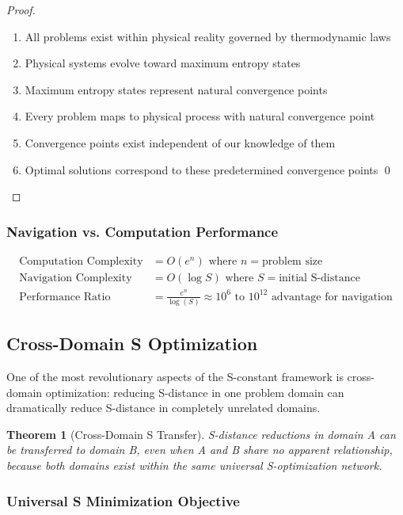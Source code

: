 \documentclass[12pt,a4paper]{article}
\newtheorem{theorem}{Theorem}[section]
\begin{document}
{{{{{{{{{{{{{{\begin{proof}
\begin{enumerate}
\item All problems exist within physical reality governed by thermodynamic laws
\item Physical systems evolve toward maximum entropy states
\item Maximum entropy states represent natural convergence points
\item Every problem maps to physical process with natural convergence point
\item Convergence points exist independent of our knowledge of them
\item Optimal solutions correspond to these predetermined convergence points \qed
\end{enumerate}
\end{proof}

\subsubsection{Navigation vs. Computation Performance}

\begin{align}
\text{Computation Complexity} &= O(e^n) \text{ where } n = \text{problem size} \\
\text{Navigation Complexity} &= O(\log S) \text{ where } S = \text{initial S-distance} \\
\text{Performance Ratio} &= \frac{e^n}{\log(S)} \approx 10^6 \text{ to } 10^{12} \text{ advantage for navigation}
\end{align}

\subsection{Cross-Domain S Optimization}

One of the most revolutionary aspects of the S-constant framework is cross-domain optimization: reducing S-distance in one problem domain can dramatically reduce S-distance in completely unrelated domains.

\begin{theorem}[Cross-Domain S Transfer]
S-distance reductions in domain A can be transferred to domain B, even when A and B share no apparent relationship, because both domains exist within the same universal S-optimization network.
\end{theorem}

\subsubsection{Universal S Minimization Objective}

}}}}}}}}}}}}}}
\end{document}
